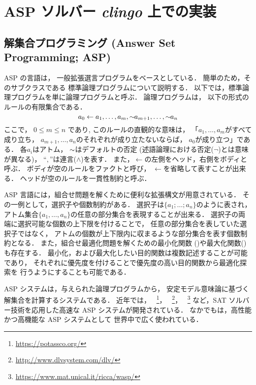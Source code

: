 \section{ASP ソルバー \textit{clingo} 上での実装}

\subsection{解集合プログラミング (Answer Set Programming; ASP)}
ASP の言語は，
一般拡張選言プログラムをベースとしている．
簡単のため，そのサブクラスである
標準論理プログラムについて説明する． 
以下では，標準論理プログラムを単に論理プログラムと呼ぶ．
論理プログラムは，
以下の形式のルールの有限集合である．
\begin{displaymath}
  \label{eq:rule}
  a_0\leftarrow a_1,\dots,a_m,{\sim\!\!{a_{m+1}}},\dots,{\sim\!\!{a_n}}
\end{displaymath}
ここで，
$0\leq m\leq n$ であり, 
このルールの直観的な意味は，
「$a_1,\ldots,a_m$がすべて成り立ち，
$a_{m+1},\ldots,a_n$のそれぞれが成り立たないならば，
$a_0$が成り立つ」である．
各$a_i$はアトム，
${\sim\!\!{}}$はデフォルトの否定 (述語論理における否定($\neg$)とは意味が異なる)，
``$,$''は連言($\land$)を表す．
また，$\leftarrow$の左側をヘッド，右側をボディと呼ぶ． 
ボディが空のルールをファクトと呼び，
$\leftarrow$を省略して表すことが出来る． 
ヘッドが空のルールを一貫性制約と呼ぶ．

ASP 言語には，組合せ問題を解くために便利な拡張構文が用意されている．
その一例として，選択子や個数制約がある． 
選択子は\(\{a_1;\dots;a_n\}\)のように表され，
アトム集合\(\{a_1,\dots,a_n\}\)の任意の部分集合を表現することが出来る．
選択子の両端に選択可能な個数の上下限を付けることで，
任意の部分集合を表していた選択子ではなく，
アトムの個数が上下限内に収まるような部分集合を表す個数制約となる．
また，組合せ最適化問題を解くための最小化関数
()や最大化関数()も存在する．
最小化，および最大化したい目的関数は複数記述することが可能であり，
それぞれに優先度を付けることで優先度の高い目的関数から最適化探索を
行うようにすることも可能である．

ASP システムは，与えられた論理プログラムから，
安定モデル意味論に基づく解集合を計算するシステムである．
近年では，
{\clingo}~\footnote{\url{https://potassco.org/}}，
{\dlv}~\footnote{\url{http://www.dlvsystem.com/dlv/}}，
{\wasp}~\footnote{\url{https://www.mat.unical.it/ricca/wasp/}}
など，SAT ソルバー技術を応用した高速な ASP システムが開発されている．
なかでも{\clingo}は，高性能かつ高機能な ASP システムとして
世界中で広く使われている．

